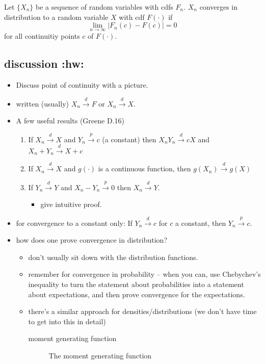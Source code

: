      Let $\{X_n\}$ be a sequence of random variables with cdfs $F_n$.
     $X_n$ converges in distribution to a random variable $X$ with cdf
     $F(\cdot)$ if $$\lim_{n\to\infty} \lvert F_n(c) - F(c) \rvert = 0$$
     for all continuitiy points $c$ of $F(\cdot)$.
\subsection{discussion \textbf{:hw:}}
\label{sec-2-2}

\begin{itemize}
\item Discuss point of continuity with a picture.
\item written (usually) $X_n \xrightarrow{d} F$ or $X_n
       \xrightarrow{d} X$.
\item A few useful results (Greene D.16)
\begin{enumerate}
\item If $X_n \xrightarrow{d} X$ and $Y_n \xrightarrow{p} c$ (a
          constant) then $X_n Y_n \xrightarrow{d} c X$ and $X_n + Y_n
          \xrightarrow{d} X + c$
\item If $X_n \xrightarrow{d} X$ and $g(\cdot)$ is a continuous
          function, then $g(X_n)\xrightarrow{d} g(X)$
\item If $Y_n \xrightarrow{d} Y$ and $X_n - Y_n \xrightarrow{p} 0$
          then $X_n \xrightarrow{d} Y$.
\begin{itemize}
\item give intuitive proof.
\end{itemize}
\end{enumerate}
\item for convergence to a constant only: If $Y_n \xrightarrow{d} c$
       for $c$ a constant, then $Y_n \xrightarrow{p} c$.
\item how does one prove convergence in distribution?
\begin{itemize}
\item don't usually sit down with the distribution functions.
\item remember for convergence in probability -- when you can, use
         Chebychev's inequality to turn the statement about
         probabilities into a statement about expectations, and then
         prove convergence for the expectations.
\item there's a similar approach for densities/distributions (we
         don't have time to get into this in detail)
\begin{description}
\item[moment generating function] The moment generating function

\end{description}
\end{itemize}
\end{itemize}
